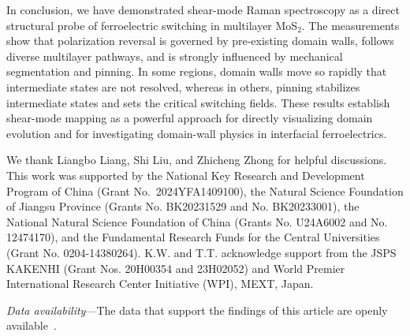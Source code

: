 \documentclass[
reprint,
superscriptaddress,









 amsmath,amssymb,
 aps,
 prb,






]{revtex4-2}
\begin{document}
In conclusion, we have demonstrated shear-mode Raman spectroscopy as a direct structural probe of ferroelectric switching in multilayer MoS$_2$. The measurements show that polarization reversal is governed by pre-existing domain walls, follows diverse multilayer pathways, and is strongly influenced by mechanical segmentation and pinning. In some regions, domain walls move so rapidly that intermediate states are not resolved, whereas in others, pinning stabilizes intermediate states and sets the critical switching fields. These results establish shear-mode mapping as a powerful approach for directly visualizing domain evolution and for investigating domain-wall physics in interfacial ferroelectrics.


We thank Liangbo Liang, Shi Liu, and Zhicheng Zhong for helpful discussions. This work was supported by the National Key Research and Development Program of China (Grant No.~2024YFA1409100), the Natural Science Foundation of Jiangsu Province (Grants No. BK20231529 and No. BK20233001), the National Natural Science Foundation of China (Grants No. U24A6002 and No. 12474170), and the Fundamental Research Funds for the Central Universities (Grant No. 0204-14380264). K.W. and T.T. acknowledge support from the JSPS KAKENHI (Grant Nos. 20H00354 and 23H02052) and World Premier International Research Center Initiative (WPI), MEXT, Japan.

\textit{Data availability}---The data that support the findings of this article are openly available~\cite{DAS}.
\end{document}
